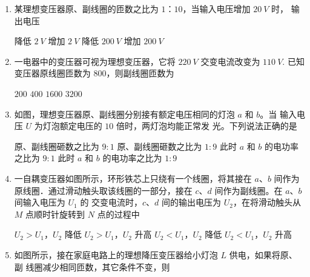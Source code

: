 \begin{enumerate}
\item
{}
某理想变压器原、副线圈的匝数之比为 $ 1 $：$ 10 $，当输入电压增加 $ 20 \ V $ 时，
输出电压  

\fourchoices
{降低 $ 2 \ V $}
{增加 $ 2 \ V $}
{降低 $ 200 \ V $}
{增加 $ 200 \ V $}



\item 
{}
一电器中的变压器可视为理想变压器，它将 $ 220 \ V $ 交变电流改变为 $ 110 \ V $. 已知
变压器原线圈匝数为 $ 800 $，则副线圈匝数为  

\fourchoices
{$200 $}
{$400 $}
{$1600 $}
{$3200 $}


\item 
{}
如图，理想变压器原、副线圈分别接有额定电压相同的灯泡 $ a $ 和 $ b $。当
输入电压 $ U $ 为灯泡额定电压的 $ 10 $ 倍时，两灯泡均能正常发
光。下列说法正确的是  
\begin{figure}[h!]
\centering

\end{figure}

\fourchoices
{原、副线圈砸数之比为 $ 9:1 $}
{原、副线圈砸数之比为 $ 1:9 $}
{此时 $ a $ 和 $ b $ 的电功率之比为 $ 9:1 $}
{此时 $ a $ 和 $ b $ 的电功率之比为 $ 1:9 $}

\item 
{}
一自耦变压器如图所示，环形铁芯上只绕有一个线圈，将其接在 $ a $、$ b $ 间作为
原线圈．通过滑动触头取该线圈的一部分，接在 $ c $、$ d $ 间作为副线圈。在 $ a $、$ b $ 间输入电压为 $ U_{1} $ 的
交变电流时，$ c $、$ d $ 间的输出电压为 $ U_{2} $，在将滑动触头从 $ M $ 点顺时针旋转到 $ N $ 点的过程中  
\begin{figure}[h!]
\centering

\end{figure}

\fourchoices
{$ U_{2} > U_{1} $，$ U_{2} $ 降低}
{$ U_{2} > U_{1} $，$ U_{2} $ 升高}
{$ U_{2} < U_{1} $，$ U_{2} $ 降低}
{$ U_{2} < U_{1} $，$ U_{2} $ 升高}


\item 
{}
如图所示，接在家庭电路上的理想降压变压器给小灯泡 $ L $ 供电，如果将原、副
线圈减少相同匝数，其它条件不变，则  
\begin{figure}[h!]
\centering

\end{figure}


\end{enumerate}
